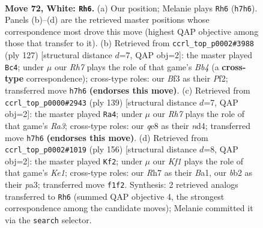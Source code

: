 \documentclass[11pt]{article}
\begin{document}
\clearpage

\begin{figure}[p]\centering
\begin{subfigure}{0.46\textwidth}\centering
\resizebox{\linewidth}{!}{%
\newchessgame
\chessboard[
  setfen={4q3/7R/8/8/8/1p1k1B2/1b6/5K2 w - - 0 72},
  showmover=false,
  pgfstyle=straightmove, color=movearrow, markmove={h7-h6}
]}
\caption{}
\end{subfigure}\hfill
\begin{subfigure}{0.46\textwidth}\centering
\resizebox{\linewidth}{!}{%
\newchessgame
\chessboard[
  setfen={8/8/8/1b6/3k4/7B/2K2p1P/8 b - - 9 64},
  showmover=false,
  pgfstyle=straightmove, color=movearrow, markmove={b5-c4}
]}
\caption{}
\end{subfigure}
\\[4pt]
\begin{subfigure}{0.46\textwidth}\centering
\resizebox{\linewidth}{!}{%
\newchessgame
\chessboard[
  setfen={8/4k3/r7/7B/3N1K1P/8/8/8 b - - 0 70},
  showmover=false,
  pgfstyle=straightmove, color=movearrow, markmove={a6-a4}
]}
\caption{}
\end{subfigure}\hfill
\begin{subfigure}{0.46\textwidth}\centering
\resizebox{\linewidth}{!}{%
\newchessgame
\chessboard[
  setfen={8/3Q4/8/7q/5k2/p7/8/B3K3 w - - 0 79},
  showmover=false,
  pgfstyle=straightmove, color=movearrow, markmove={e1-f2}
]}
\caption{}
\end{subfigure}
\caption{\textbf{Move 72, White: \texttt{Rh6}.} (a) Our position; Melanie plays \texttt{Rh6} (\texttt{h7h6}). Panels (b)--(d) are the retrieved master positions whose correspondence most drove this move (highest QAP objective among those that transfer to it). (b) Retrieved from \texttt{ccrl\_top\_p0002\#3988} (ply 127) [structural distance $d$=7, QAP obj=2]: the master played \texttt{Bc4}; under $\mu$ our \emph{Rh7} plays the role of that game's \emph{Bb4} (a \textbf{cross-type} correspondence); cross-type roles: our \emph{B}f3 as their \emph{P}f2; transferred move \texttt{h7h6} \textbf{(endorses this move)}. (c) Retrieved from \texttt{ccrl\_top\_p0000\#2943} (ply 139) [structural distance $d$=7, QAP obj=2]: the master played \texttt{Ra4}; under $\mu$ our \emph{Rh7} plays the role of that game's \emph{Ra3}; cross-type roles: our \emph{q}e8 as their \emph{n}d4; transferred move \texttt{h7h6} \textbf{(endorses this move)}. (d) Retrieved from \texttt{ccrl\_top\_p0002\#1019} (ply 156) [structural distance $d$=8, QAP obj=2]: the master played \texttt{Kf2}; under $\mu$ our \emph{Kf1} plays the role of that game's \emph{Ke1}; cross-type roles: our \emph{R}h7 as their \emph{B}a1, our \emph{b}b2 as their \emph{p}a3; transferred move \texttt{f1f2}. Synthesis: 2 retrieved analogs transferred to \texttt{Rh6} (summed QAP objective 4, the strongest correspondence among the candidate moves); Melanie committed it via the \texttt{search} selector.}
\label{fig:thought-m142}
\end{figure}
\end{document}

